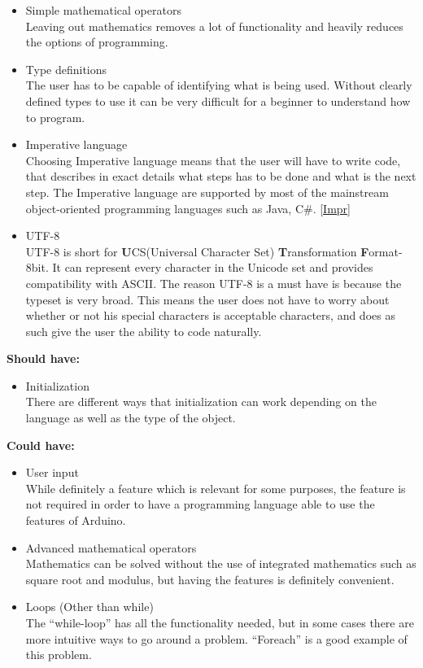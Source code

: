 \begin{itemize}
\item Simple mathematical operators \\
Leaving out mathematics removes a lot of functionality and heavily reduces the options of programming. \\

\item Type definitions \\
The user has to be capable of identifying what is being used. Without clearly defined types to use it can be very difficult for a beginner to understand how to program. \\

\item Imperative language \\
Choosing Imperative language means that the user will have to write code, that describes in exact details what steps has to be done and what is the next step. The Imperative language are supported by most of the mainstream object-oriented programming languages such as Java, C\#. \ref{Impr}

\item UTF-8 \\
UTF-8 is short for \textbf{U}CS(Universal Character Set) \textbf{T}ransformation \textbf{F}ormat-8bit. It can represent every character in the Unicode set and provides compatibility with ASCII. 
The reason UTF-8 is a must have is because the typeset is very broad. This means the user does not have to worry about whether or not his special characters is acceptable characters, and does as such give the user the ability to code naturally.\\
\end{itemize}

\textbf{Should have:}
\begin{itemize}
\item Initialization \\
There are different ways that initialization can work depending on the language as well as the type of the object. \\
\end{itemize}

\textbf{Could have:}
\begin{itemize}
\item User input \\
While definitely a feature which is relevant for some purposes, the feature is not required in order to have a programming language able to use the features of Arduino. \\

\item Advanced mathematical operators \\
Mathematics can be solved without the use of integrated mathematics such as square root and modulus, but having the features is definitely convenient. \\

\item Loops (Other than while) \\
The ``while-loop'' has all the functionality needed, but in some cases there are more intuitive ways to go around a problem. ``Foreach'' is a good example of this problem.\\
\end{itemize}